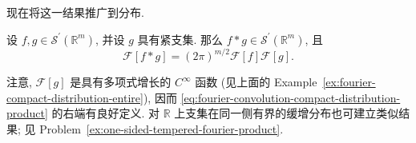 现在将这一结果推广到分布.

\begin{Theorem}
\label{thm:fourier-convolution-compact-distribution}
设 $f,g\in\mathcal{S}^{\prime}(\mathbb{R}^m)$, 并设 $g$ 具有紧支集. 那么 $f*g\in\mathcal{S}^{\prime}(\mathbb{R}^m)$, 且
\begin{equation}\label{eq:fourier-convolution-compact-distribution-product}
\mathcal{F}[f*g]=(2\pi)^{m/2}\mathcal{F}[f]\mathcal{F}[g].
\end{equation}

\end{Theorem}

注意, $\mathcal{F}[g]$ 是具有多项式增长的 $C^\infty$ 函数 (见上面的 Example~\ref{ex:fourier-compact-distribution-entire}), 因而 \eqref{eq:fourier-convolution-compact-distribution-product} 的右端有良好定义. 对 $\mathbb{R}$ 上支集在同一侧有界的缓增分布也可建立类似结果; 见 Problem~\ref{ex:one-sided-tempered-fourier-product}.

